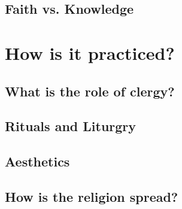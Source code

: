 \documentclass[12pt, letterpaper]{article}
\begin{document}
\subsection{Faith vs. Knowledge}

\section{How is it practiced?}

\subsection{What is the role of clergy?}

\subsection{Rituals and Liturgry}

\subsection{Aesthetics}

\subsection{How is the religion spread?}





  
  
\end{document}
